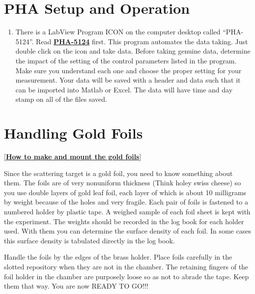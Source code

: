 \documentclass{../lab}
\begin{document}


\section{PHA Setup and Operation}

\begin{enumerate}
    \item There is a LabView Program ICON on the computer desktop called ``PHA-5124''. Read \href{http://experimentationlab.berkeley.edu/PHA-5124Program}{\textbf{PHA-5124}} first. This program automates the data taking. Just double click on the icon and take data. Before taking genuine data, determine the impact of the setting of the control parameters listed in the program. Make sure you understand each one and choose the proper setting for your measurement. Your data will be saved with a header and data such that it can be imported into Matlab or Excel. The data will have time and day stamp on all of the files saved.

\end{enumerate}

\section{Handling Gold Foils}

[\href{http://physics111.lib.berkeley.edu/Physics111/Reprints/RUT/Procedure\%20for\%20Making\%20Foils.pdf}{\textbf{How to make and mount the gold foils}}]

Since the scattering target is a gold foil, you need to know something about them. The foils are of very nonuniform thickness (Think holey swiss cheese) so you use double layers of gold leaf foil, each layer of which is about 10 milligrams by weight because of the holes and very fragile. Each pair of foils is fastened to a numbered holder by plastic tape. A weighed sample of each foil sheet is kept with the experiment. The weights should be recorded in the log book for each holder used. With them you can determine the surface density of each foil. In some cases this surface density is tabulated directly in the log book.

Handle the foils by the edges of the brass holder. Place foils carefully in the slotted repository when they are not in the chamber. The retaining fingers of the foil holder in the chamber are purposely loose so as not to abrade the tape. Keep them that way. You are now READY TO GO!!!
\end{document}

